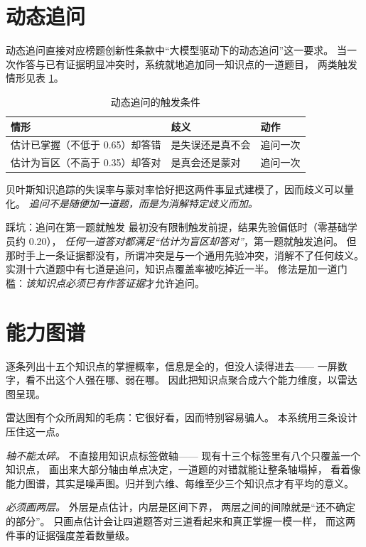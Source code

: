\section{动态追问}

动态追问直接对应榜题创新性条款中“大模型驱动下的动态追问”这一要求。
当一次作答与已有证据明显冲突时，系统就地追加同一知识点的一道题目，
两类触发情形见表 \ref{tab:probe}。

\begin{table}[htbp]\centering\small
\caption{动态追问的触发条件}\label{tab:probe}
\begin{tabular}{@{}p{4.4cm}p{4cm}p{3cm}@{}}
\toprule
情形 & 歧义 & 动作 \\
\midrule
估计已掌握（不低于 0.65）却答错 & 是失误还是真不会 & 追问一次 \\
估计为盲区（不高于 0.35）却答对 & 是真会还是蒙对 & 追问一次 \\
\bottomrule
\end{tabular}
\end{table}

贝叶斯知识追踪的失误率与蒙对率恰好把这两件事显式建模了，因而歧义可以量化。
\emph{追问不是随便加一道题，而是为消解特定歧义而加。}

\begin{keynote}{踩坑：追问在第一题就触发}
最初没有限制触发前提，结果先验偏低时（零基础学员约 0.20），
\emph{任何一道答对都满足“估计为盲区却答对”}，第一题就触发追问。
但那时手上一条证据都没有，所谓冲突是与一个通用先验冲突，消解不了任何歧义。
实测十六道题中有七道是追问，知识点覆盖率被吃掉近一半。
修法是加一道门槛：\emph{该知识点必须已有作答证据}才允许追问。
\end{keynote}

\section{能力图谱}

逐条列出十五个知识点的掌握概率，信息是全的，但没人读得进去——
一屏数字，看不出这个人强在哪、弱在哪。
因此把知识点聚合成六个能力维度，以雷达图呈现。

雷达图有个众所周知的毛病：它很好看，因而特别容易骗人。
本系统用三条设计压住这一点。

\emph{轴不能太碎。} 不直接用知识点标签做轴——
现有十三个标签里有八个只覆盖一个知识点，
画出来大部分轴由单点决定，一道题的对错就能让整条轴塌掉，
看着像能力图谱，其实是噪声图。归并到六维、每维至少三个知识点才有平均的意义。

\emph{必须画两层。} 外层是点估计，内层是区间下界，
两层之间的间隙就是“还不确定的部分”。
只画点估计会让四道题答对三道看起来和真正掌握一模一样，
而这两件事的证据强度差着数量级。

